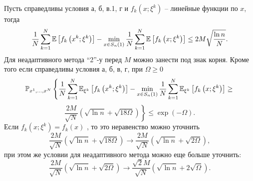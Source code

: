 \begin{theorem}

Пусть справедливы условия а, б, в.1, г и $f_k \left( {x;\xi ^k} \right)$ -- линейные функции по $x$, тогда
\[
\frac{1}{N}\sum\limits_{k=1}^N {\mathrm{{\mathbb E}}\left[ {f_k \left( {x^k;\xi ^k} \right)} 
\right]} -\mathop {\min }\limits_{x\in S_n \left( 1 \right)} 
\frac{1}{N}\sum\limits_{k=1}^N {\mathrm{{\mathbb E}}\left[ {f_k \left( {x;\xi ^k} \right)} 
\right]} \le 2M\sqrt {\frac{\ln n}{N}} .
\]
Для неадаптивного метода ``2''-у перед $M$ можно занести под знак корня.
Кроме того если справедливы условия а, б, в, г, при  $\Omega \ge 0$
\[
\mathrm{{\mathbb P}}_{x^1,...,x^N} \left\{ {\frac{1}{N}\sum\limits_{k=1}^N {\mathrm{{\mathbb E}}_{\xi ^k} \left[ 
{f_k \left( {x^k;\xi ^k} \right)} \right]} -\mathop {\min }\limits_{x\in S_n 
\left( 1 \right)} \frac{1}{N}\sum\limits_{k=1}^N {\mathrm{{\mathbb E}}_{\xi ^k} \left[ {f_k 
\left( {x;\xi ^k} \right)} \right]} \ge } 
\right.
\]
\[
\left. {\frac{2M}{\sqrt N 
}\left( {\sqrt {\ln n} +\sqrt {18\Omega } } \right)} \right\} \le \exp 
\left( {-\Omega } \right).
\]
Если $f_k \left( {x;\xi ^k} \right) = f_k \left( x \right)$ , то это неравенство можно уточнить
\[
\frac{2M}{\sqrt N }\left( {\sqrt {\ln n} +\sqrt {18\Omega } } \right)\to 
\frac{2M}{\sqrt N }\left( {\sqrt {\ln n} +\sqrt {2\Omega } } \right),
\]
при этом же условии для неадаптивного метода можно еще больше уточнить:
\[
\frac{2M}{\sqrt N }\left( {\sqrt {\ln n} +\sqrt {2\Omega } } \right)\to 
\frac{\sqrt 2 M}{\sqrt N }\left( {\sqrt {\ln n} +2\sqrt \Omega } \right).
\]

\end{theorem}